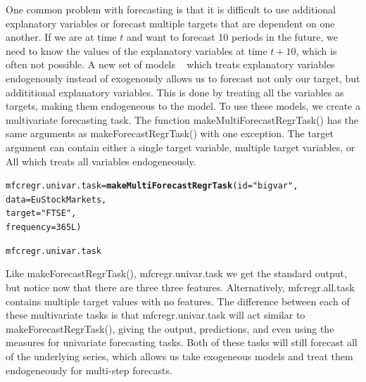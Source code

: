 \documentclass{article}\usepackage[]{graphicx}\usepackage[]{color}
\makeatletter
\newcommand{\hlnum}[1]{\textcolor[rgb]{0.686,0.059,0.569}{#1}}%
\newcommand{\hlstr}[1]{\textcolor[rgb]{0.192,0.494,0.8}{#1}}%
\newcommand{\hlstd}[1]{\textcolor[rgb]{0.345,0.345,0.345}{#1}}%
\newcommand{\hlkwb}[1]{\textcolor[rgb]{0.69,0.353,0.396}{#1}}%
\newcommand{\hlkwc}[1]{\textcolor[rgb]{0.333,0.667,0.333}{#1}}%
\newcommand{\hlkwd}[1]{\textcolor[rgb]{0.737,0.353,0.396}{\textbf{#1}}}%
\newenvironment{kframe}{%
 \def\at@end@of@kframe{}%
 \ifinner\ifhmode%
  \def\at@end@of@kframe{\end{minipage}}%
  \begin{minipage}{\columnwidth}%
 \fi\fi%
 \def\FrameCommand##1{\hskip\@totalleftmargin \hskip-\fboxsep
 \colorbox{shadecolor}{##1}\hskip-\fboxsep
     \hskip-\linewidth \hskip-\@totalleftmargin \hskip\columnwidth}%
 \MakeFramed {\advance\hsize-\width
   \@totalleftmargin\z@ \linewidth\hsize
   \@setminipage}}%
 {\par\unskip\endMakeFramed%
 \at@end@of@kframe}
\newenvironment{knitrout}{}{} %
\theoremstyle{definition}
\newcommand\code{\@codex}
\def\@codex#1{{\normalfont\ttfamily\hyphenchar\font=-1 #1}}
\makeatother
\begin{document}
One common problem with forecasting is that it is difficult to use additional explanatory variables or forecast multiple targets that are dependent on one another. If we are at time $t$ and want to forecast 10 periods in the future, we need to know the values of the explanatory variables at time $t+10$, which is often not possible. A new set of models ~\cite{BigVAR} which treats explanatory variables endogenously instead of exogenously allows us to forecast not only our target, but addititional explanatory variables. This is done by treating all the variables as targets, making them endogeneous to the model. To use these models, we create a multivariate forecasting task. The function \code{makeMultiForecastRegrTask()} has the same arguments as \code{makeForecastRegrTask()} with one exception. The \code{target} argument can contain either a single target variable, multiple target variables, or \code{All} which treats all variables endogeneously.

\begin{knitrout}
\color{fgcolor}\begin{kframe}
\begin{alltt}
\hlstd{mfcregr.univar.task} \hlkwb{=} \hlkwd{makeMultiForecastRegrTask}\hlstd{(}\hlkwc{id} \hlstd{=} \hlstr{"bigvar"}\hlstd{,}
                                                \hlkwc{data} \hlstd{= EuStockMarkets,}
                                                \hlkwc{target} \hlstd{=} \hlstr{"FTSE"}\hlstd{,}
                                                \hlkwc{frequency} \hlstd{=} \hlnum{365L}\hlstd{)}
\end{alltt}


{\ttfamily\noindent\bfseries{}}\begin{alltt}
\hlstd{mfcregr.univar.task}
\end{alltt}


{\ttfamily\noindent\bfseries\color{errorcolor}{\#\# Error in eval(expr, envir, enclos): object 'mfcregr.univar.task' not found}}\end{kframe}
\end{knitrout}

Like \code{makeForecastRegrTask()}, \code{mfcregr.univar.task} we get the standard output, but notice now that there are three three features. Alternatively, \code{mfcregr.all.task} contains multiple target values with no features. The difference between each of these multivariate tasks is that \code{mfcregr.univar.task} will act similar to \code{makeForecastRegrTask()}, giving the output, predictions, and even using the measures for univariate forecasting tasks. Both of these tasks will still forecast all of the underlying series, which allows us take exogeneous models and treat them endogeneously for multi-step forecasts.
\end{document}
